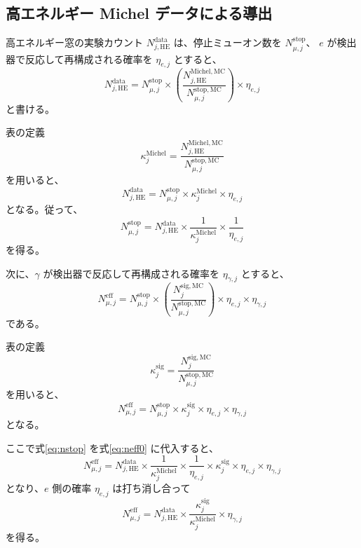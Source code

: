 \documentclass[a4paper,11pt]{jsarticle}
\begin{document}
\subsection{高エネルギー Michel データによる導出}
高エネルギー窓の実験カウント $N_{j,\mathrm{HE}}^{\mathrm{data}}$ は、停止ミューオン数を $N_{\mu,j}^{\mathrm{stop}}$、
$e$ が検出器で反応して再構成される確率を $\eta_{e,j}$ とすると、
\begin{equation}
N_{j,\mathrm{HE}}^{\mathrm{data}}
=
N_{\mu,j}^{\mathrm{stop}}
\times
\left(
\frac{N_{j,\mathrm{HE}}^{\mathrm{Michel,MC}}}{N_{\mu,j}^{\mathrm{stop,MC}}}
\right)
\times
\eta_{e,j}
\end{equation}
と書ける。

表の定義
\begin{equation}
\kappa_{j}^{\mathrm{Michel}}
=
\frac{N_{j,\mathrm{HE}}^{\mathrm{Michel,MC}}}{N_{\mu,j}^{\mathrm{stop,MC}}}
\end{equation}
を用いると、
\begin{equation}
N_{j,\mathrm{HE}}^{\mathrm{data}}
=
N_{\mu,j}^{\mathrm{stop}}
\times
\kappa_{j}^{\mathrm{Michel}}
\times
\eta_{e,j}
\end{equation}
となる。従って、
\begin{equation}
N_{\mu,j}^{\mathrm{stop}}
=
N_{j,\mathrm{HE}}^{\mathrm{data}}
\times
\frac{1}{\kappa_{j}^{\mathrm{Michel}}}
\times
\frac{1}{\eta_{e,j}}
\label{eq:nstop}
\end{equation}
を得る。

次に、$\gamma$ が検出器で反応して再構成される確率を $\eta_{\gamma,j}$ とすると、
\begin{equation}
N_{\mu,j}^{\mathrm{eff}}
=
N_{\mu,j}^{\mathrm{stop}}
\times
\left(
\frac{N_{j}^{\mathrm{sig,MC}}}{N_{\mu,j}^{\mathrm{stop,MC}}}
\right)
\times
\eta_{e,j}
\times
\eta_{\gamma,j}
\end{equation}
である。

表の定義
\begin{equation}
\kappa_{j}^{\mathrm{sig}}
=
\frac{N_{j}^{\mathrm{sig,MC}}}{N_{\mu,j}^{\mathrm{stop,MC}}}
\end{equation}
を用いると、
\begin{equation}
N_{\mu,j}^{\mathrm{eff}}
=
N_{\mu,j}^{\mathrm{stop}}
\times
\kappa_{j}^{\mathrm{sig}}
\times
\eta_{e,j}
\times
\eta_{\gamma,j}
\label{eq:neff0}
\end{equation}
となる。

ここで式\eqref{eq:nstop} を式\eqref{eq:neff0} に代入すると、
\begin{equation}
N_{\mu,j}^{\mathrm{eff}}
=
N_{j,\mathrm{HE}}^{\mathrm{data}}
\times
\frac{1}{\kappa_{j}^{\mathrm{Michel}}}
\times
\frac{1}{\eta_{e,j}}
\times
\kappa_{j}^{\mathrm{sig}}
\times
\eta_{e,j}
\times
\eta_{\gamma,j}
\end{equation}
となり、$e$ 側の確率 $\eta_{e,j}$ は打ち消し合って
\begin{equation}
N_{\mu,j}^{\mathrm{eff}}
=
N_{j,\mathrm{HE}}^{\mathrm{data}}
\times
\frac{\kappa_{j}^{\mathrm{sig}}}{\kappa_{j}^{\mathrm{Michel}}}
\times
\eta_{\gamma,j}
\label{eq:neff_final}
\end{equation}
を得る。
\end{document}
